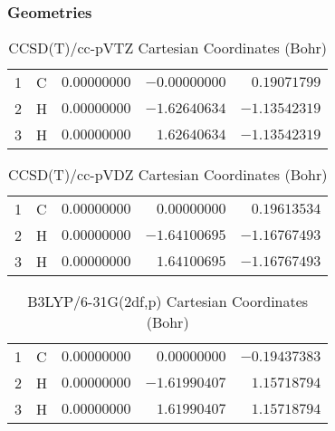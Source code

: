 \documentclass[10pt,oneside]{article}
\begin{document}
\clearpage

\subsection{\ \ \ }

\subsubsection*{Geometries}
\begin{table}[h!]
\centering
\caption{CCSD(T)/cc-pVTZ Cartesian Coordinates (Bohr)}
\begin{tabular}{llrrr}
1  & C  & $ 0.00000000$ & $-0.00000000$ & $ 0.19071799$ \\
2  & H  & $ 0.00000000$ & $-1.62640634$ & $-1.13542319$ \\
3  & H  & $ 0.00000000$ & $ 1.62640634$ & $-1.13542319$ \\
\end{tabular}
\end{table}

\begin{table}[h!]
\centering
\caption{CCSD(T)/cc-pVDZ Cartesian Coordinates (Bohr)}
\begin{tabular}{llrrr}
1  & C  & $ 0.00000000$ & $ 0.00000000$ & $ 0.19613534$ \\
2  & H  & $ 0.00000000$ & $-1.64100695$ & $-1.16767493$ \\
3  & H  & $ 0.00000000$ & $ 1.64100695$ & $-1.16767493$ \\
\end{tabular}
\end{table}

\begin{table}[h!]
\centering
\caption{B3LYP/6-31G(2df,p) Cartesian Coordinates (Bohr)}
\begin{tabular}{llrrr}
1  & C  & $ 0.00000000$ & $ 0.00000000$ & $-0.19437383$ \\
2  & H  & $ 0.00000000$ & $-1.61990407$ & $ 1.15718794$ \\
3  & H  & $ 0.00000000$ & $ 1.61990407$ & $ 1.15718794$ \\
\end{tabular}
\end{table}

\clearpage
\end{document}
